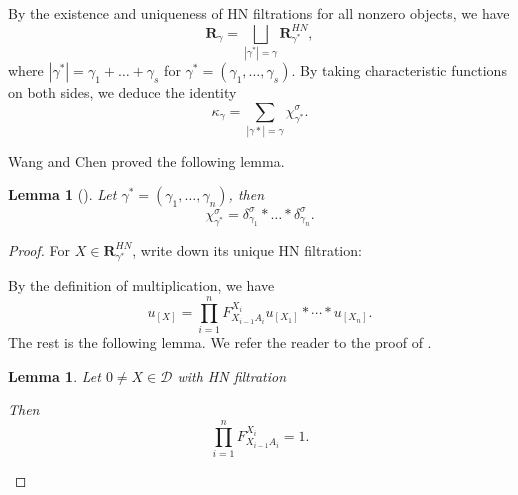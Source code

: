 \documentclass[a4paper,12pt]{amsart}
\newtheorem{lemma}[theorem]{Lemma}
\begin{document}
By the existence and uniqueness of HN filtrations for all nonzero objects, we have
\[\mathbf{R}_\gamma=\bigsqcup_{|\gamma^*|=\gamma}\mathbf{R}_{\gamma^*}^{HN},\]
where $|\gamma^*|=\gamma_1+\dots+\gamma_s$ for $\gamma^*=(\gamma_1,\dots,\gamma_s)$. By taking characteristic functions on both sides, we deduce the identity
\[\kappa_\gamma=\sum_{|\gamma*|=\gamma}\chi^\sigma_{\gamma^*}.\]

Wang and Chen proved the following lemma.
\begin{lemma}[{\cite[Proposition 3.6]{WC2023}}]\label{Wang-Chen}
    Let $\gamma^*=(\gamma_1,\dots,\gamma_n)$, then
    \[\chi^\sigma_{\gamma^*}=\delta^\sigma_{\gamma_1}*\dots*\delta^\sigma_{\gamma_n}.\]
\end{lemma}
\begin{proof}
    For $X\in\mathbf{R}_{\gamma^*}^{HN}$, write down its unique HN filtration:
    \begin{center}
    \end{center}
    By the definition of multiplication, we have
    \[u_{[X]}=\prod_{i=1}^n F_{X_{i-1}A_i}^{X_i}u_{[X_1]}*\cdots*u_{[X_n]}.\]
    The rest is the following lemma. We refer the reader to the proof of \cite[Proposition 3.6]{WC2023}.
    \begin{lemma}\label{WC}
        Let $0\neq X\in\mathcal{D}$ with HN filtration
        \begin{center}
    \end{center}
    Then
    \[\prod_{i=1}^n F_{X_{i-1}A_i}^{X_i}=1.\]
    \end{lemma}
\end{proof}
\end{document}
